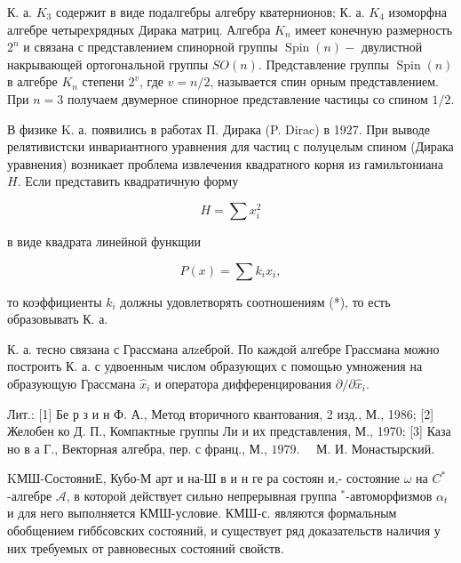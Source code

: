 \documentclass[10pt]{article}
\begin{document}
К. а. $K_{3}$ содержит в виде подалгебры алгебру кватернионов; К. а. $K_{4}$ изоморфна алгебре четырехрядных Дирака матриц. Алгебра $K_{n}$ имеет конечную размерность $2^{n}$ и связана с представлением спинорной группы $\operatorname{Spin}(n)-$ двулистной накрывающей ортогональной группы $S O(n)$. Представление группы $\operatorname{Spin}(n)$ в алгебре $K_{n}$ степени $2^{v}$, где $v=n / 2$, называется спин орным представлением. При $n=3$ получаем двумерное спинорное представление частицы со спином $1 / 2$.



В физике K. а. появились в работах П. Дирака (P. Dirac) в 1927. При выводе релятивистски инвариантного уравнения для частиц с полуцелым спином (Дирака уравнения) возникает проблема извлечения квадратного корня из гамильтониана $H$. Если представить квадратичную форму



\[

H=\sum x_{i}^{2}

\]



в виде квадрата линейной функщии



\[

P(x)=\sum k_{i} x_{i},

\]



то коэффициенты $k_{i}$ должны удовлетворять соотношениям (*), то есть образовывать К. а.



К. а. тесно связана с Грассмана алzеброй. По каждой алгебре Грассмана можно построить К. а. с удвоенным числом образующих с помощью умножения на образующую Грассмана $\hat{x}_{i}$ и оператора дифференцирования $\partial / \partial \hat{x}_{i}$.



Лит.: [1] Бе р з и н Ф. А., Метод вторичного квантования, 2 изд., М., 1986; [2] Желобен ко Д. П., Компактные группы Ли и их представления, М., 1970; [3] Каза но в а Г., Векторная алгебра, пер. с франц., М., $1979 . \quad$ М. И. Монастырский.



KМШ-СостояниЕ, Кубо-М арт и на-Ш в и н ге ра состоян и,- состояние $\omega$ на $C^{*}$-алгебре $\mathscr{A}$, в которой действует сильно непрерывная группа ${ }^{*}$-автоморфизмов $\alpha_{t}$ и для него выполняется КМШ-условие. КМШ-с. являются формальным обобщением гиббсовских состояний, и существует ряд доказательств наличия у них требуемых от равновесных состояний свойств.
\end{document}
